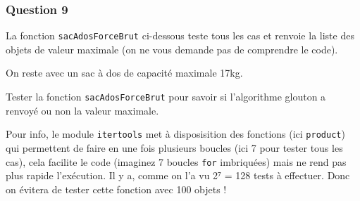 \documentclass[
  paper=a4,
  ,captions=tableheading
]{scrartcl}
\begin{document}
\hypertarget{question-9}{%
\subsubsection{Question 9}\label{question-9}}

La fonction \texttt{sacAdosForceBrut} ci-dessous teste tous les cas et
renvoie la liste des objets de valeur maximale (on ne vous demande pas
de comprendre le code).

On reste avec un sac à dos de capacité maximale 17kg.

Tester la fonction \texttt{sacAdosForceBrut} pour savoir si l'algorithme
glouton a renvoyé ou non la valeur maximale.

Pour info, le module \texttt{itertools} met à disposisition des
fonctions (ici \texttt{product}) qui permettent de faire en une fois
plusieurs boucles (ici 7 pour tester tous les cas), cela facilite le
code (imaginez 7 boucles \texttt{for} imbriquées) mais ne rend pas plus
rapide l'exécution. Il y a, comme on l'a vu 2⁷ = 128 tests à effectuer.
Donc on évitera de tester cette fonction avec 100 objets !
\end{document}
